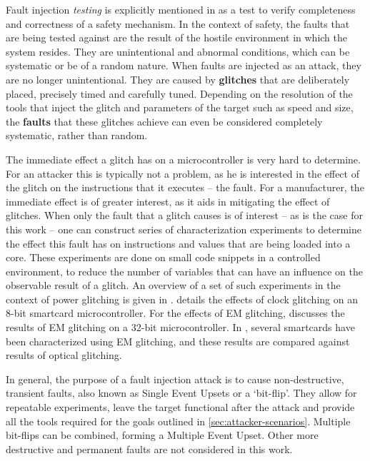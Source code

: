 \documentclass[10pt]{article}
\begin{document}
    Fault injection \emph{testing} is explicitly mentioned in \citet{iso26262-5} as a test to verify completeness and correctness of a safety mechanism. In the context of safety, the faults that are being tested against are the result of the hostile environment in which the system resides. They are unintentional and abnormal conditions, which can be systematic or be of a random nature. When faults are injected as an attack, they are no longer unintentional. They are caused by \textbf{glitches} that are deliberately placed, precisely timed and carefully tuned.
    Depending on the resolution of the tools that inject the glitch and parameters of the target such as speed and size, the \textbf{faults} that these glitches achieve can even be considered completely systematic, rather than random. 

    The immediate effect a glitch has on a microcontroller is very hard to determine. For an attacker this is typically not a problem, as he is interested in the effect of the glitch on the instructions that it executes -- the fault. For a manufacturer, the immediate effect is of greater interest, as it aids in mitigating the effect of glitches.  When only the fault that a glitch causes is of interest -- as is the case for this work -- one can construct series of characterization experiments to determine the effect this fault has on instructions and values that are being loaded into a core. These experiments are done on small code snippets in a controlled environment, to reduce the number of variables that can have an influence on the observable result of a glitch. 
    An overview of a set of such experiments in the context of power glitching is given in \citet{spruyt_building_2012}. \citet{balasch_-depth_2011} details the effects of clock glitching on an 8-bit smartcard microcontroller. For the effects of EM glitching, \citet{moro_electromagnetic_2013} discusses the results of EM glitching on a 32-bit microcontroller. In \citet{aarts_electromagnetic_2013}, several smartcards have been characterized using EM glitching, and these results are compared against results of optical glitching.

    In general, the purpose of a fault injection attack is to cause non-destructive, transient faults, also known as Single Event Upsets or a `bit-flip'. They allow for repeatable experiments, leave the target functional after the attack and provide all the tools required for the goals outlined in \autoref{sec:attacker-scenarios}. Multiple bit-flips can be combined, forming a Multiple Event Upset. Other more destructive and permanent faults are not considered in this work. \cite{bar-el_sorcerers_2006}
\end{document}
